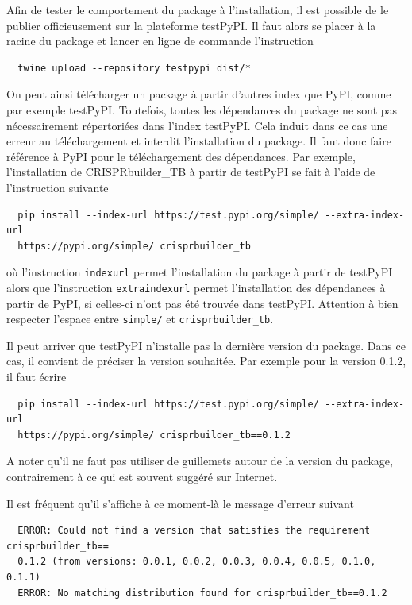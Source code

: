 \documentclass[twoside,a4paper,11pt,frenchb,openany]{report}
\begin{document}
Afin de tester le comportement du package à l'installation, il est possible de le publier officieusement sur la plateforme testPyPI. Il faut alors se placer à la racine du package et lancer en ligne de commande l'instruction
\begin{verbatim}  twine upload --repository testpypi dist/*\end{verbatim}

On peut ainsi télécharger un package à partir d'autres index que PyPI, comme par exemple testPyPI. Toutefois, toutes les dépendances du package ne sont pas nécessairement répertoriées dans l'index testPyPI. Cela induit dans ce cas une erreur au téléchargement et interdit l'installation du package. Il faut donc faire référence à PyPI pour le téléchargement des dépendances. Par exemple, l'installation de CRISPRbuilder\_TB à partir de testPyPI se fait à l'aide de l'instruction suivante

\begin{verbatim}  pip install --index-url https://test.pypi.org/simple/ --extra-index-url 
  https://pypi.org/simple/ crisprbuilder_tb\end{verbatim} 

où l'instruction \texttt{\textemdash \textemdash index\textemdash url} permet l'installation du package à partir de testPyPI alors que l'instruction \texttt{\textemdash \textemdash extra\textemdash index\textemdash url} permet l'installation des dépendances à partir de PyPI, si celles-ci n'ont pas été trouvée dans testPyPI. Attention à bien respecter l'espace entre \texttt{simple/} et \texttt{crisprbuilder\_tb}.

Il peut arriver que testPyPI n'installe pas la dernière version du package. Dans ce cas, il convient de préciser la version souhaitée. Par exemple pour la version 0.1.2, il faut écrire

\begin{verbatim}  pip install --index-url https://test.pypi.org/simple/ --extra-index-url 
  https://pypi.org/simple/ crisprbuilder_tb==0.1.2\end{verbatim} 

A noter qu'il ne faut pas utiliser de guillemets autour de la version du package, contrairement à ce qui est souvent suggéré sur Internet.

Il est fréquent qu'il s'affiche à ce moment-là le message d'erreur suivant

\begin{verbatim}  ERROR: Could not find a version that satisfies the requirement crisprbuilder_tb==
  0.1.2 (from versions: 0.0.1, 0.0.2, 0.0.3, 0.0.4, 0.0.5, 0.1.0, 0.1.1)
  ERROR: No matching distribution found for crisprbuilder_tb==0.1.2\end{verbatim}
\end{document}
